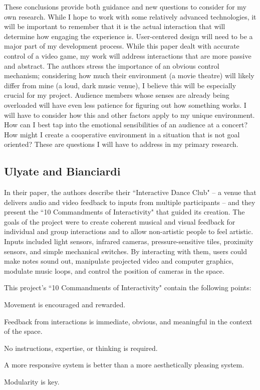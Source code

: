 These conclusions provide both guidance and new questions to consider for my own research. While I hope to work with some relatively advanced technologies, it will be important to remember that it is the actual interaction that will determine how engaging the experience is. User-centered design will need to be a major part of my development process. While this paper dealt with accurate control of a video game, my work will address interactions that are more passive and abstract. The authors stress the importance of an obvious control mechanism; considering how much their environment (a movie theatre) will likely differ from mine (a loud, dark music venue), I believe this will be especially crucial for my project. Audience members whose senses are already being overloaded will have even less patience for figuring out how something works. I will have to consider how this and other factors apply to my unique environment. How can I best tap into the emotional sensibilities of an audience at a concert? How might I create a cooperative environment in a situation that is not goal oriented? These are questions I will have to address in my primary research.

\subsection{Ulyate and Bianciardi}

In their paper, the authors describe their ``Interactive Dance Club" -- a venue that delivers audio and video feedback to inputs from multiple participants -- and they present the ``10 Commandments of Interactivity" that guided its creation. The goals of the project were to create coherent musical and visual feedback for individual and group interactions and to allow non-artistic people to feel artistic. Inputs included light sensors, infrared cameras, pressure-sensitive tiles, proximity sensors, and simple mechanical switches. By interacting with them, users could make notes sound out, manipulate projected video and computer graphics, modulate music loops, and control the position of cameras in the space.

This project's ``10 Commandments of Interactivity" contain the following points:
\begin{itemize*}
	\item Movement is encouraged and rewarded.
	\item Feedback from interactions is immediate, obvious, and meaningful in the context of the space.
	\item No instructions, expertise, or thinking is required.
	\item A more responsive system is better than a more aesthetically pleasing system.
	\item Modularity is key.
\end{itemize*}

